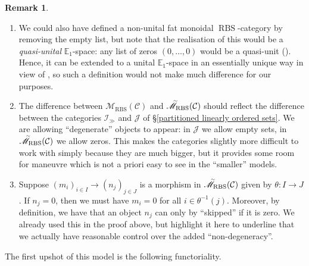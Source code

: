 \documentclass[12pt, reqno]{amsart}
\theoremstyle{plain}
\theoremstyle{definition}
\newtheorem{remark}[theorem]{Remark}
\begin{document}
\begin{remark} \ 
\begin{enumerate}
\item We could also have defined a non-unital fat monoidal $\operatorname{RBS}$-category by removing the empty list, but note that the realisation of this would be a \textit{quasi-unital} $\mathbb{E}_1$-space: any list of zeros $(0,\ldots,0)$ would be a quasi-unit (\cite[Definition 5.4.3.1]{LurieHA}). Hence, it can be extended to a unital $\mathbb{E}_1$-space in an essentially unique way in view of \cite[Theorem 5.4.3.5]{LurieHA}, so such a definition would not make much difference for our purposes.
\item The difference between $\mathscr{M}_{\operatorname{RBS}}(\mathcal{C}) $ and $\accentset{\sim}{\mathscr{M}}_{\operatorname{RBS}}(\mathcal{C})$ should reflect the difference between the categories $\mathcal{I}_\gg$ and $\mathcal{J}$ of \S \ref{partitioned linearly ordered sets}. We are allowing ``degenerate'' objects to appear: in $\mathcal{J}$ we allow empty sets, in $\accentset{\sim}{\mathscr{M}}_{\operatorname{RBS}}(\mathcal{C})$ we allow zeros. This makes the categories slightly more difficult to work with simply because they are much bigger, but it provides some room for maneuvre which is not a priori easy to see in the ``smaller'' models.
\item Suppose $(m_i)_{i\in I}\rightarrow (n_j)_{j\in J}$ is a morphism in $\accentset{\sim}{\mathscr{M}}_{\operatorname{RBS}}(\mathcal{C})$ given by $\theta\colon I\rightarrow J$. If $n_j=0$, then we must have $m_i=0$ for all $i\in \theta^{-1}(j)$. Moreover, by definition, we have that an object $n_j$ can only by ``skipped'' if it is zero. We already used this in the proof above, but highlight it here to underline that we actually have reasonable control over the added ``non-degeneracy''.\qedhere
\end{enumerate}
\end{remark}

The first upshot of this model is the following functoriality.
\end{document}
